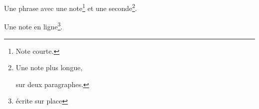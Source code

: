 Une phrase avec une note\footnote{Note courte.} et une seconde\footnote{Une note plus longue,

  sur deux paragraphes.}.

Une note en ligne\footnote{écrite sur place}.
